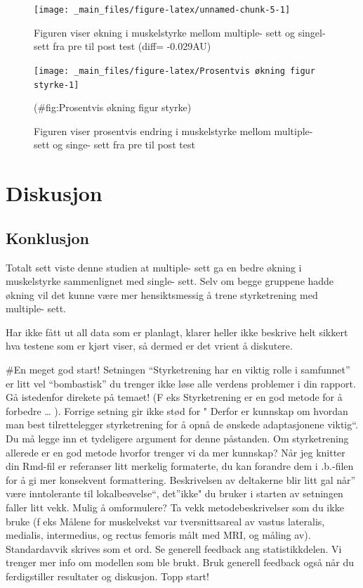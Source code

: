 \documentclass[
]{book}
\begin{document}
\begin{figure}
\texttt{[image: \_main\_files/figure-latex/unnamed-chunk-5-1]} \caption{Figuren viser økning i muskelstyrke mellom multiple- sett og singel- sett fra pre til post test (diff= -0.029AU)}\label{fig:unnamed-chunk-5}
\end{figure}

\begin{figure}
\texttt{[image: \_main\_files/figure-latex/Prosentvis økning figur styrke-1]} \caption{Figuren viser prosentvis endring i muskelstyrke mellom multiple- sett og singe- sett fra pre til post test}(\#fig:Prosentvis økning figur styrke)
\end{figure}

\hypertarget{diskusjon-1}{%
\section{Diskusjon}\label{diskusjon-1}}

\hypertarget{konklusjon}{%
\subsection{Konklusjon}\label{konklusjon}}

Totalt sett viste denne studien at multiple- sett ga en bedre økning i muskelstyrke sammenlignet med single- sett. Selv om begge gruppene hadde økning vil det kunne være mer hensiktsmessig å trene styrketrening med multiple- sett.

Har ikke fått ut all data som er planlagt, klarer heller ikke beskrive helt sikkert hva testene som er kjørt viser, så dermed er det vrient å diskutere.

\#En meget god start! Setningen ``Styrketrening har en viktig rolle i samfunnet'' er litt vel ``bombastisk'' du trenger ikke løse alle verdens problemer i din rapport. Gå istedenfor direkete på temaet! (F eks Styrketrening er en god metode for å forbedre \ldots{} ). Forrige setning gir ikke stød for " Derfor er kunnskap om hvordan man best tilrettelegger styrketrening for å opnå de ønskede adaptasjonene viktig``. Du må legge inn et tydeligere argument for denne påstanden. Om styrketrening allerede er en god metode hvorfor trenger vi da mer kunnskap?
Når jeg knitter din Rmd-fil er referanser litt merkelig formaterte, du kan forandre dem i .b.-filen for å gi mer konsekvent formattering. Beskrivelsen av deltakerne blir litt gal når'' være inntolerante til lokalbeøvelse``, det''ikke" du bruker i starten av setningen faller litt vekk. Mulig å omformulere? Ta vekk metodebeskrivelser som du ikke bruke (f eks Målene for muskelvekst var tversnittsareal av vastus lateralis, medialis, intermedius, og rectus femoris målt med MRI, og måling av). Standardavvik skrives som et ord. Se generell feedback ang statistikkdelen. Vi trenger mer info om modellen som ble brukt. Bruk generell feedback også når du ferdigstiller resultater og diskusjon. Topp start!

  
\end{document}
